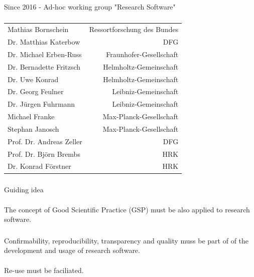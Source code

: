 \documentclass{beamer}
\begin{document}
\begin{frame}
  \frametitle{}
    \begin{block}{}
      \begin{center}
        Since 2016 - Ad-hoc working group "Research Software"
      \end{center}
    \end{block}
\end{frame}


\begin{frame}
  \frametitle{}
  \begin{tabular}{lr}
    Mathias Bornschein & Ressortforschung des Bundes\\
    Dr. Matthias Katerbow & DFG \\
    Dr. Michael Erben-Russ & Fraunhofer-Gesellschaft \\
    Dr. Bernadette Fritzsch & Helmholtz-Gemeinschaft \\
    Dr. Uwe Konrad & Helmholtz-Gemeinschaft\\
    Dr. Georg Feulner & Leibniz-Gemeinschaft\\
    Dr. Jürgen Fuhrmann & Leibniz-Gemeinschaft\\
    Michael Franke & Max-Planck-Gesellschaft\\
    Stephan Janosch & Max-Planck-Gesellschaft\\
    Prof. Dr. Andreas Zeller & DFG\\
    Prof. Dr. Björn Brembs & HRK\\
    Dr. Konrad Förstner & HRK\\
  \end{tabular}
\end{frame}

\begin{frame}
  \frametitle{}
  \begin{block}{}
    Guiding idea\\
    \ \\The concept of Good Scientific Practice (GSP) must be also applied to
    research software.
  \end{block}
\end{frame}

\begin{frame}
  \frametitle{}
  \begin{block}{}
    Confirmability, reproducibility, transparency and quality muss be
    part of of the development and usage of research software.\\
    \ \\
    Re-use must be faciliated.
  \end{block}
\end{frame}
\end{document}
